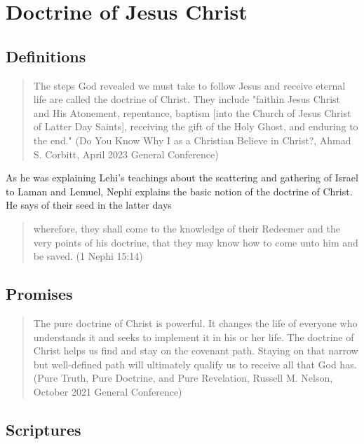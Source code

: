 \chapter{Doctrine of Jesus Christ}

\section{Definitions}

\begin{quotation}
The steps God revealed we must take to follow Jesus and receive eternal life are called the doctrine of Christ. They include "faithin Jesus Christ and His Atonement, repentance, baptism [into the Church of Jesus Christ of Latter Day Saints], receiving the gift of the Holy Ghost, and enduring to the end." (Do You Know Why I as a Christian Believe in Christ?, Ahmad S. Corbitt, April 2023 General Conference)
\end{quotation}

As he was explaining Lehi's teachings about the scattering and gathering of Israel to Laman and Lemuel, Nephi explains the basic notion of the doctrine of Christ. He says of their seed in the latter days

\begin{quotation}
wherefore, they shall come to the knowledge of their Redeemer and the very points of his doctrine, that they may know how to come unto him and be saved. (1 Nephi 15:14)
\end{quotation}

\section{Promises}

\begin{quotation}
The pure doctrine of Christ is powerful. It changes the life of everyone who understands it and seeks to implement it in his or her life. The doctrine of Christ helps us find and stay on the covenant path. Staying on that narrow but well-defined path will ultimately qualify us to receive all that God has. (Pure Truth, Pure Doctrine, and Pure Revelation, Russell M. Nelson, October 2021 General Conference)
\end{quotation}

\section{Scriptures}

